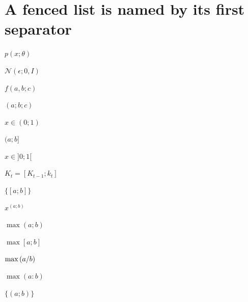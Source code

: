 \documentclass{article}
\begin{document}
\section{A fenced list is named by its first separator}
$p(x;\theta)$

$\mathcal{N}(\epsilon;0,I)$

$f(a,b;c)$

$\left(a;b;c\right)$

$x\in(0;1)$

$(a;b]$

$x\in]0;1[$

$K_t=[K_{t-1};k_t]$

$\{[a;b]\}$

$x^{(a;b)}$

$\max(a;b)$

$\max[a;b]$

$\max\left(a\middle/b\right)$

$\max(a:b)$

$\{(a;b)\}$
\end{document}
